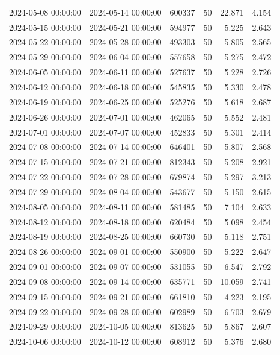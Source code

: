 \begin{tabular}{llrrrr}
2024-05-08 00:00:00 & 2024-05-14 00:00:00 & 600337 & 50 & 22.871 & 4.154 \\
2024-05-15 00:00:00 & 2024-05-21 00:00:00 & 594977 & 50 & 5.225 & 2.643 \\
2024-05-22 00:00:00 & 2024-05-28 00:00:00 & 493303 & 50 & 5.805 & 2.565 \\
2024-05-29 00:00:00 & 2024-06-04 00:00:00 & 557658 & 50 & 5.275 & 2.472 \\
2024-06-05 00:00:00 & 2024-06-11 00:00:00 & 527637 & 50 & 5.228 & 2.726 \\
2024-06-12 00:00:00 & 2024-06-18 00:00:00 & 545835 & 50 & 5.330 & 2.478 \\
2024-06-19 00:00:00 & 2024-06-25 00:00:00 & 525276 & 50 & 5.618 & 2.687 \\
2024-06-26 00:00:00 & 2024-07-01 00:00:00 & 462065 & 50 & 5.552 & 2.481 \\
2024-07-01 00:00:00 & 2024-07-07 00:00:00 & 452833 & 50 & 5.301 & 2.414 \\
2024-07-08 00:00:00 & 2024-07-14 00:00:00 & 646401 & 50 & 5.807 & 2.568 \\
2024-07-15 00:00:00 & 2024-07-21 00:00:00 & 812343 & 50 & 5.208 & 2.921 \\
2024-07-22 00:00:00 & 2024-07-28 00:00:00 & 679874 & 50 & 5.297 & 3.213 \\
2024-07-29 00:00:00 & 2024-08-04 00:00:00 & 543677 & 50 & 5.150 & 2.615 \\
2024-08-05 00:00:00 & 2024-08-11 00:00:00 & 581485 & 50 & 7.104 & 2.633 \\
2024-08-12 00:00:00 & 2024-08-18 00:00:00 & 620484 & 50 & 5.098 & 2.454 \\
2024-08-19 00:00:00 & 2024-08-25 00:00:00 & 660730 & 50 & 5.118 & 2.751 \\
2024-08-26 00:00:00 & 2024-09-01 00:00:00 & 550900 & 50 & 5.222 & 2.647 \\
2024-09-01 00:00:00 & 2024-09-07 00:00:00 & 531055 & 50 & 6.547 & 2.792 \\
2024-09-08 00:00:00 & 2024-09-14 00:00:00 & 635771 & 50 & 10.059 & 2.741 \\
2024-09-15 00:00:00 & 2024-09-21 00:00:00 & 661810 & 50 & 4.223 & 2.195 \\
2024-09-22 00:00:00 & 2024-09-28 00:00:00 & 602989 & 50 & 6.703 & 2.679 \\
2024-09-29 00:00:00 & 2024-10-05 00:00:00 & 813625 & 50 & 5.867 & 2.607 \\
2024-10-06 00:00:00 & 2024-10-12 00:00:00 & 608912 & 50 & 5.376 & 2.680 \\

\end{tabular}
